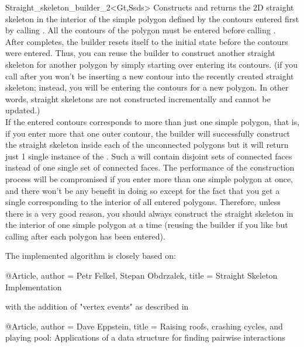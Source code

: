 \begin{ccRefClass}{Straight_skeleton_builder_2<Gt,Ssds>}
\ccGlue
{}
{Constructs and returns the 2D straight skeleton in the interior of the simple polygon defined by the contours entered first by calling . All the contours of the polygon must be entered before calling .\\
After  completes, the builder resets itself to the initial state before the contours were entered. Thus, you can reuse the builder to construct another straight skeleton for another polygon by simply starting over entering its contours. (if you call  after  you won't be inserting a new contour into the recently created straight skeleton; instead, you will be entering the contours for a new polygon. In other words, straight skeletons are not constructed incrementally and cannot be updated.)\\
If the entered contours corresponds to more than just one simple polygon, that is, if you enter more that one outer contour, the builder will successfully construct the straight skeleton inside each of the unconnected polygons but it will return just 1 single instance of the . Such a  will contain disjoint sets of connected faces instead of one single set of connected faces. The performance of the construction process will be compromised if you enter more than one simple polygon at once, and there won't be any benefit in doing so except for the fact that you get a single  corresponding to the interior of all entered polygons. Therefore, unless there is a very good reason, you should always construct the straight skeleton in the interior of one simple polygon at a time (reusing the builder if you like but calling  after each polygon has been entered).}



The implemented algorithm is closely based on:

@Article{,
author = {Petr Felkel, Stepan Obdrzalek},
title = {Straight Skeleton Implementation}
}

with the addition of "vertex events" as described in

@Article{,
author = {Dave Eppstein},
title = {Raising roofs, crashing cycles, and playing pool: Applications of a data structure
for finding pairwise interactions}
}


\end{ccRefClass}
